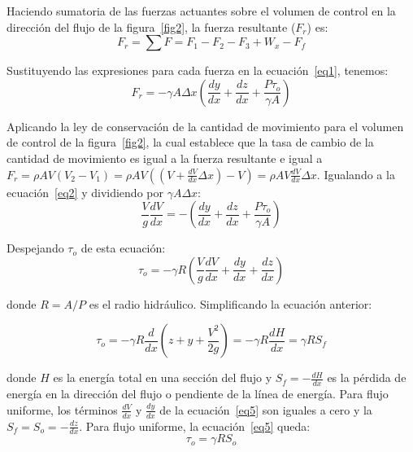 \documentclass[11pt, oneside]{article}
\begin{document}
Haciendo sumatoria de las fuerzas actuantes sobre el volumen de control en la direcci\'on del flujo de la figura~\ref{fig2}, la fuerza resultante ($F_r$) es:
\begin{equation}
 F_r = \sum F = F_1 - F_2 - F_3 + W_x - F_f 
\label{eq1}
\end{equation}

Sustituyendo las expresiones para cada fuerza en la ecuaci\'on~\ref{eq1}, tenemos:
\begin{equation}
 F_r = -\gamma A \Delta x \left( \frac{dy}{dx} + \frac{dz}{dx} + \frac{P \tau_o}{\gamma A} \right)
\label{eq2}
\end{equation}

Aplicando la ley de conservaci\'on de la cantidad de movimiento para el volumen de control de la figura~\ref{fig2}, la cual establece que la tasa de cambio de la cantidad de movimiento es igual a la fuerza resultante e igual a $F_r = \rho AV (V_2 - V_1) = \rho AV \left( \left( V + \frac{dV}{dx}\Delta x \right) - V \right) = \rho A V \frac{dV}{dx} \Delta x$. Igualando a la ecuaci\'on~\ref{eq2} y dividiendo por $\gamma A \Delta x$:
\begin{equation}
\frac{V}{g}\frac{dV}{dx} = -\left( \frac{dy}{dx} + \frac{dz}{dx} + \frac{P \tau_o}{\gamma A} \right)
\label{eq3}
\end{equation}

Despejando $\tau_o$ de esta ecuaci\'on:
\begin{equation}
\tau_o = -\gamma R \left( \frac{V}{g}\frac{dV}{dx} + \frac{dy}{dx} + \frac{dz}{dx} \right)
\label{eq4}
\end{equation}

donde $R=A/P$ es el radio hidr\'aulico. Simplificando la ecuaci\'on anterior:

\begin{equation}
\tau_o = -\gamma R \frac{d}{dx} \left( z + y + \frac{V^2}{2g} \right) = -\gamma R \frac{dH}{dx} = \gamma R S_f
\label{eq5}
\end{equation}

donde $H$ es la energ\'ia total en una secci\'on del flujo y $S_f = -\frac{dH}{dx}$ es la p\'erdida de energ\'ia en la direcci\'on del flujo o pendiente de la l\'inea de energ\'ia. Para flujo uniforme, los términos  $\frac{dV}{dx}$ y  $\frac{dy}{dx}$ de la ecuaci\'on~\ref{eq5} son iguales a cero y la $S_f = S_o = -\frac{dz}{dx}$. Para flujo uniforme, la ecuaci\'on~\ref{eq5} queda:
\begin{equation}
\tau_o =  \gamma R S_o
\label{eq6}
\end{equation}
\end{document}
